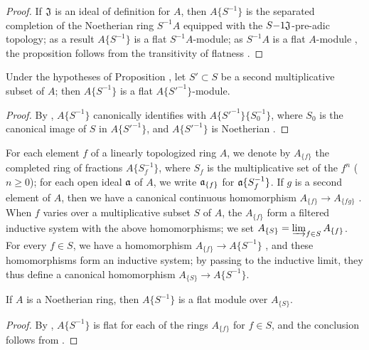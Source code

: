\begin{proof}
\label{proof-0.7.6.13}
If $\mathfrak{J}$ is an ideal of definition for $A$, then $A\{S^{-1}\}$ is the separated completion
of the Noetherian ring $S^{-1}A$ equipped with the $S{-1}\mathfrak{J}$-pre-adic topology; as a result
 $A\{S^{-1}\}$ is a flat $S^{-1}A$-module; as $S^{-1}A$ is a flat
$A$-module , the proposition follows from the transitivity of flatness .
\end{proof}

\begin{cor}[7.6.14]
\label{0.7.6.14}
Under the hypotheses of Proposition , let $S'\subset S$ be a second
multiplicative subset of $A$; then $A\{S^{-1}\}$ is a flat $A\{{S'}^{-1}\}$-module.
\end{cor}

\begin{proof}
\label{proof-0.7.6.14}
By , $A\{S^{-1}\}$ canonically identifies with
$A\{{S'}^{-1}\}\{S_0^{-1}\}$, where $S_0$ is the canonical image of $S$ in $A\{{S'}^{-1}\}$, and
$A\{{S'}^{-1}\}$ is Noetherian .
\end{proof}

\begin{env}[7.6.15]
\label{0.7.6.15}
For each element $f$ of a linearly topologized ring $A$, we denote by $A_{\{f\}}$ the completed
ring of fractions $A\{S_f^{-1}\}$, where $S_f$ is the multiplicative set of the $f^n$
($n\geqslant 0$); for each open ideal $\mathfrak{a}$ of $A$, we write $\mathfrak{a}_{\{f\}}$ for
$\mathfrak{a}\{S_f^{-1}\}$. If $g$ is a second element of $A$, then we have a canonical continuous
homomorphism $A_{\{f\}}\to A_{\{fg\}}$ . When $f$ varies over a
multiplicative subset $S$ of $A$, the $A_{\{f\}}$ form a filtered inductive system with the above
homomorphisms; we set $A_{\{S\}}=\varinjlim_{f\in S}A_{\{f\}}$. For every $f\in S$, we have a
homomorphism $A_{\{f\}}\to A\{S^{-1}\}$ , and
these homomorphisms form an inductive system; by passing to the inductive limit, they thus define
a canonical homomorphism $A_{\{S\}}\to A\{S^{-1}\}$.
\end{env}

\begin{prop}[7.6.16]
\label{0.7.6.16}
If $A$ is a Noetherian ring, then $A\{S^{-1}\}$ is a flat module over $A_{\{S\}}$.
\end{prop}

\begin{proof}
\label{proof-0.7.6.16}
By , $A\{S^{-1}\}$ is flat for each of the rings $A_{\{f\}}$ for
$f\in S$, and the conclusion follows from .
\end{proof}

